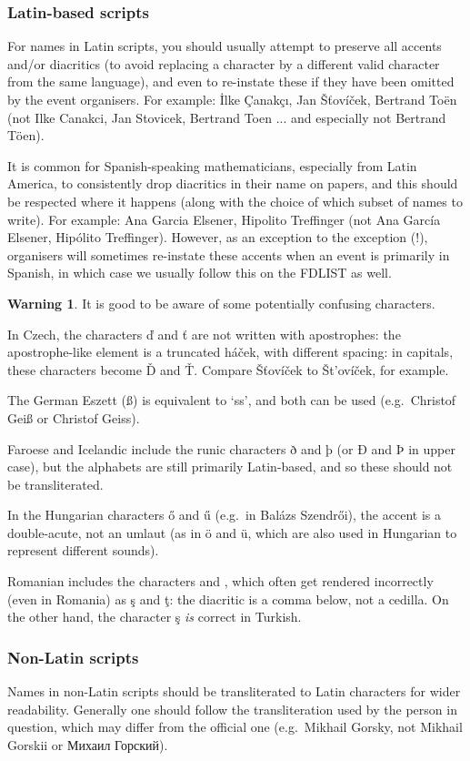 \documentclass[12pt]{scrartcl}
\theoremstyle{definition}
\newtheorem*{warn}{Warning}
\begin{document}
\subsubsection{Latin-based scripts}
For names in Latin scripts, you should usually attempt to preserve all accents and/or diacritics (to avoid replacing a character by a different valid character from the same language), and even to re-instate these if they have been omitted by the event organisers. For example: İlke Çanakçı, Jan Šťovíček, Bertrand Toën (not Ilke Canakci, Jan Stovicek, Bertrand Toen ... and especially not Bertrand Töen).

It is common for Spanish-speaking mathematicians, especially from Latin America, to consistently drop diacritics in their name on papers, and this should be respected where it happens (along with the choice of which subset of names to write).
For example: Ana Garcia Elsener, Hipolito Treffinger (not Ana García Elsener, Hipólito Treffinger).
However, as an exception to the exception (!), organisers will sometimes re-instate these accents when an event is primarily in Spanish, in which case we usually follow this on the FDLIST as well.

\begin{warn}
It is good to be aware of some potentially confusing characters.

In Czech, the characters ď and ť are not written with apostrophes: the apostrophe-like element is a truncated háček, with different spacing: in capitals, these characters become Ď and Ť.
Compare Šťovíček to Št'ovíček, for example.

The German Eszett (ß) is equivalent to `ss', and both can be used (e.g.\ Christof Geiß or Christof Geiss).

Faroese and Icelandic include the runic characters ð and þ (or Ð and Þ in upper case), but the alphabets are still primarily Latin-based, and so these should not be transliterated.

In the Hungarian characters ő and ű (e.g.\ in Balázs Szendrői), the accent is a double-acute, not an umlaut (as in ö and ü, which are also used in Hungarian to represent different sounds).

Romanian includes the characters  and , which often get rendered incorrectly (even in Romania) as ş and ţ:  the diacritic is a comma below, not a cedilla.
On the other hand, the character ş \emph{is} correct in Turkish.
\end{warn}

\subsubsection{Non-Latin scripts}
Names in non-Latin scripts should be transliterated to Latin characters for wider readability.
Generally one should follow the transliteration used by the person in question, which may differ from the official one (e.g.\ Mikhail Gorsky, not Mikhail Gorskii or {\selectfont Михаил Горский}).
\end{document}
